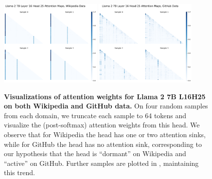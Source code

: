 \begin{figure}
    \centering
    \includegraphics[width=0.45\textwidth]{Figures/L16_H25/attn_maps_l16h25_wiki_small.pdf}
    \hspace{0.075\textwidth}
    \includegraphics[width=0.45\textwidth]{Figures/L16_H25/attn_maps_l16h25_github_small.pdf}
    \caption{\small\textbf{Visualizations of attention weights for Llama 2 7B L16H25 on both Wikipedia and GitHub data.} On four random samples from each domain, we truncate each sample to 64 tokens and visualize the (post-softmax) attention weights from this head. We observe that for Wikipedia the head has one or two attention sinks, while for GitHub the head has no attention sink, corresponding to our hypothesis that the head is ``dormant'' on Wikipedia and ``active'' on GitHub. Further samples are plotted in , maintaining this trend.}
    \label{fig:attn_l16_h25_small}
\end{figure}


